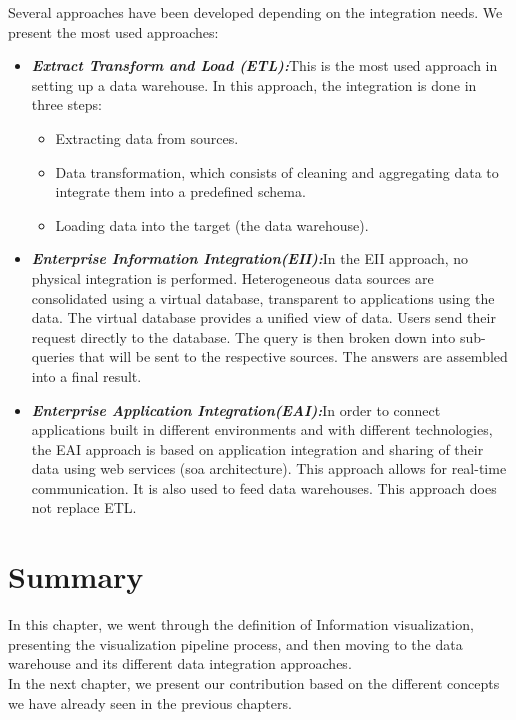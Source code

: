 Several approaches have been developed depending on the integration needs. We present the most used approaches\cite{naitEntropot}:
\begin{itemize}
  \renewcommand{\labelitemi}{$\bullet$}
  \item \textbf{\textit{Extract Transform and Load (ETL):}}\newline This is the most used approach in setting up a data warehouse. In this approach, the integration is done in three steps:
\begin{itemize}
\item Extracting data from sources.
\item Data transformation, which consists of cleaning and aggregating data to integrate them into a predefined schema.
\item Loading data into the target (the data warehouse).
\end{itemize}

  \item \textbf{\textit{Enterprise Information Integration(EII):}}\newline In the EII approach, no physical integration is performed. Heterogeneous data sources are consolidated using a virtual database, transparent to applications using the data. The virtual database provides a unified view of data. Users send their request directly to the database. The query is then broken down into sub-queries that will be sent to the respective sources. The answers are assembled into a final result.
  \item \textbf{\textit{Enterprise Application Integration(EAI):}}\newline In order to connect applications built in different environments and with different technologies, the EAI approach is based on application integration and sharing of their data using web services (\gls{soa} architecture). This approach allows for real-time communication.
It is also used to feed data warehouses. This approach does not replace ETL.
\end{itemize}



\section{Summary}
In this chapter, we went through the definition of Information visualization, presenting the visualization pipeline process, and then moving to the data warehouse and its different data integration approaches.\\
In the next chapter, we present our contribution based on the different concepts we have already seen in the previous chapters.
